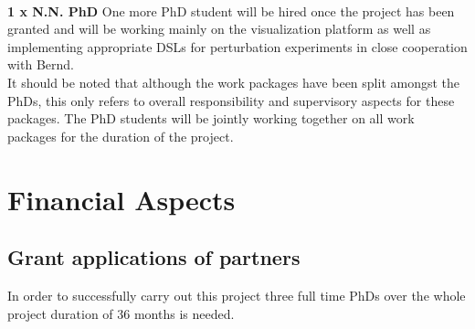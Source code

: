 \documentclass[a4paper,11pt]{article}
\begin{document}
\\[0,2cm]
\textbf{1 x N.N. PhD} One more PhD student will be hired once the project has been granted and will be working mainly on the visualization platform as well as implementing appropriate DSLs for perturbation experiments in close cooperation with Bernd.
\\[0,2cm]
It should be noted that although the work packages have been split amongst the PhDs, this only refers to overall responsibility and supervisory aspects for these packages. The PhD students will be jointly working together on all work packages for the duration of the project.



\section{Financial Aspects}
%

\subsection{Grant applications of partners}
In order to successfully carry out this project three full time PhDs over the whole project duration of 36 months is needed. 
\\[0,2cm]
\end{document}
